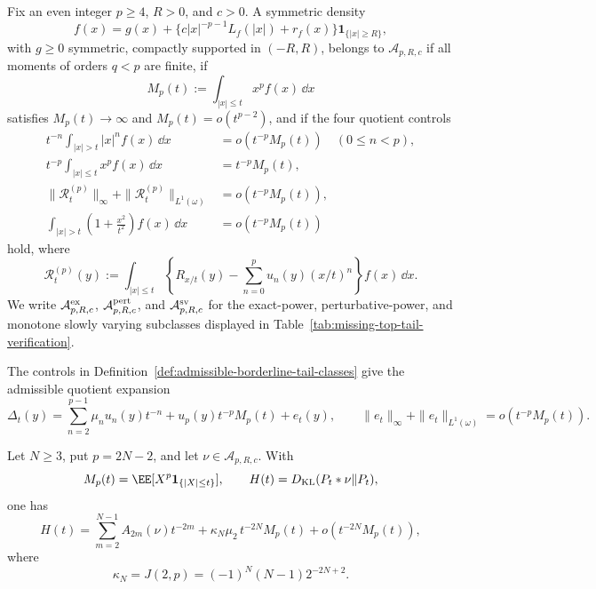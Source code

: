 \begin{definition}%
\label{def:admissible-borderline-tail-classes}
Fix an even integer \(p\ge4\), \(R>0\), and \(c>0\).  A symmetric density
\[
  f(x)=g(x)+\{c|x|^{-p-1}L_f(|x|)+r_f(x)\}
       \mathbf1_{\{|x|\ge R\}},
\]
with \(g\ge0\) symmetric, compactly supported in \((-R,R)\), belongs to
\(\mathcal A_{p,R,c}\) if all moments of orders \(q<p\) are finite, if
\[
  M_p(t):=\int_{|x|\le t}x^pf(x)\,\dd x
\]
satisfies \(M_p(t)\to\infty\) and \(M_p(t)=o(t^{p-2})\), and if the four
quotient controls
\begin{align}
t^{-n}\int_{|x|>t}|x|^nf(x)\,\dd x
  &=o(t^{-p}M_p(t))\quad(0\le n<p), \label{eq:admissible-lower-tail-control}\\
t^{-p}\int_{|x|\le t}x^pf(x)\,\dd x
  &=t^{-p}M_p(t), \label{eq:admissible-top-mode-control}\\
\|\mathcal R_t^{(p)}\|_\infty+\|\mathcal R_t^{(p)}\|_{L^1(\omega)}
  &=o(t^{-p}M_p(t)), \label{eq:admissible-local-remainder-control}\\
\int_{|x|>t}\left(1+\frac{x^2}{t^2}\right)f(x)\,\dd x
  &=o(t^{-p}M_p(t)) \label{eq:admissible-far-tail-control}
\end{align}
hold, where
\[
\mathcal R_t^{(p)}(y):=
  \int_{|x|\le t}
  \left\{R_{x/t}(y)-\sum_{n=0}^{p}u_n(y)(x/t)^n\right\}f(x)\,\dd x .
\]
We write \(\mathcal A_{p,R,c}^{\rm ex}\), \(\mathcal A_{p,R,c}^{\rm pert}\),
and \(\mathcal A_{p,R,c}^{\rm sv}\) for the exact-power, perturbative-power,
and monotone slowly varying subclasses displayed in
Table~\ref{tab:missing-top-tail-verification}.
\end{definition}

The controls in Definition~\ref{def:admissible-borderline-tail-classes} give
the admissible quotient expansion
\begin{equation}\label{eq:admissible-borderline-quotient-expansion}
  \Delta_t(y)=
  \sum_{n=2}^{p-1}\mu_nu_n(y)t^{-n}
  +u_p(y)t^{-p}M_p(t)+e_t(y),
  \qquad
  \|e_t\|_\infty+\|e_t\|_{L^1(\omega)}
  =o(t^{-p}M_p(t)).
\end{equation}

\begin{corollary}%
\label{thm:admissible-borderline-tail-entropy}
Let \(N\ge3\), put \(p=2N-2\), and let
\(\nu\in\mathcal A_{p,R,c}\).  With
\[
  M_p(t)=\EE[X^p{\bf1}_{\{|X|\le t\}}],
  \qquad
  H(t)=D_{\mathrm{KL}}(P_t*\nu\|P_t),
\]
one has
\[
H(t)=
\sum_{m=2}^{N-1}A_{2m}(\nu)t^{-2m}
+\kappa_N\mu_2\,t^{-2N}M_p(t)
+o(t^{-2N}M_p(t)),
\]
where
\[
  \kappa_N=J(2,p)=(-1)^N(N-1)2^{-2N+2}.
\]
\end{corollary}

